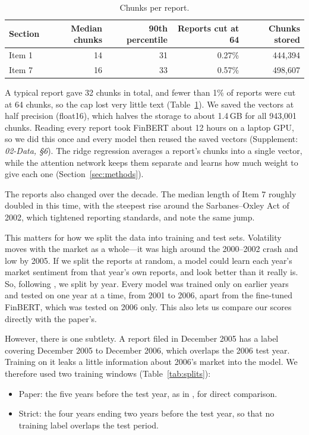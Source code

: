 \documentclass[11pt,a4paper]{article}
\newcommand{\supp}[1]{(Supplement: \textit{#1})}
\begin{document}
\begin{table}[ht]
  \centering
  \small
  \caption{Chunks per report.}\label{tab:chunks}
  \begin{tabular}{@{}lrrrr@{}}
    \toprule
    Section & Median chunks & 90th percentile & Reports cut at 64 & Chunks stored \\
    \midrule
    Item 1 & 14 & 31 & 0.27\% & 444,394 \\
    Item 7 & 16 & 33 & 0.57\% & 498,607 \\
    \bottomrule
  \end{tabular}
\end{table}

A typical report gave 32 chunks in total, and fewer than 1\% of reports were cut at 64 chunks, so the cap lost very little text (Table~\ref{tab:chunks}). We saved the vectors at half precision (float16), which halves the storage to about 1.4\,GB for all 943,001 chunks. Reading every report took FinBERT about 12 hours on a laptop GPU, so we did this once and every model then reused the saved vectors \supp{02-Data, \S6}. The ridge regression averages a report's chunks into a single vector, while the attention network keeps them separate and learns how much weight to give each one (Section~\ref{sec:methods}).

The reports also changed over the decade. The median length of Item 7 roughly doubled in this time, with the steepest rise around the Sarbanes--Oxley Act of 2002, which tightened reporting standards, and \citet{kogan2009} note the same jump.

This matters for how we split the data into training and test sets. Volatility moves with the market as a whole---it was high around the 2000--2002 crash and low by 2005. If we split the reports at random, a model could learn each year's market sentiment from that year's own reports, and look better than it really is. So, following \citet{kogan2009}, we split by year. Every model was trained only on earlier years and tested on one year at a time, from 2001 to 2006, apart from the fine-tuned FinBERT, which was tested on 2006 only. This also lets us compare our scores directly with the paper's.

However, there is one subtlety. A report filed in December 2005 has a label covering December 2005 to December 2006, which overlaps the 2006 test year. Training on it leaks a little information about 2006's market into the model. We therefore used two training windows (Table~\ref{tab:splits}):
\begin{itemize}
  \item Paper: the five years before the test year, as in \citet{kogan2009}, for direct comparison.
  \item Strict: the four years ending two years before the test year, so that no training label overlaps the test period.
\end{itemize}
\end{document}
